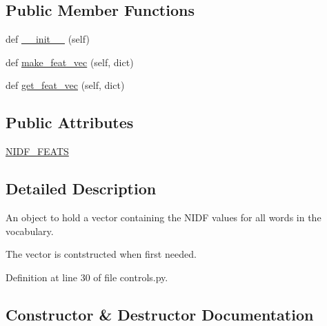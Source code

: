 \subsection*{Public Member Functions}
\begin{DoxyCompactItemize}
\item 
def \hyperlink{classprojects_1_1controllable__dialogue_1_1controllable__seq2seq_1_1controls_1_1NIDFFeats_ad812b961118077aeb5099cae4373cdd4}{\+\_\+\+\_\+init\+\_\+\+\_\+} (self)
\item 
def \hyperlink{classprojects_1_1controllable__dialogue_1_1controllable__seq2seq_1_1controls_1_1NIDFFeats_aa47a19d4008d0431359caa6d813f34bc}{make\+\_\+feat\+\_\+vec} (self, dict)
\item 
def \hyperlink{classprojects_1_1controllable__dialogue_1_1controllable__seq2seq_1_1controls_1_1NIDFFeats_a43490f17254d5695620c6cc63eb2e491}{get\+\_\+feat\+\_\+vec} (self, dict)
\end{DoxyCompactItemize}
\subsection*{Public Attributes}
\begin{DoxyCompactItemize}
\item 
\hyperlink{classprojects_1_1controllable__dialogue_1_1controllable__seq2seq_1_1controls_1_1NIDFFeats_a6717e3ef6420caafd4eb177c07e007fe}{N\+I\+D\+F\+\_\+\+F\+E\+A\+TS}
\end{DoxyCompactItemize}


\subsection{Detailed Description}
\begin{DoxyVerb}An object to hold a vector containing the NIDF values for all words in the
vocabulary.

The vector is contstructed when first needed.
\end{DoxyVerb}
 

Definition at line 30 of file controls.\+py.



\subsection{Constructor \& Destructor Documentation}
\mbox{\label{classprojects_1_1controllable__dialogue_1_1controllable__seq2seq_1_1controls_1_1NIDFFeats_ad812b961118077aeb5099cae4373cdd4}} 

